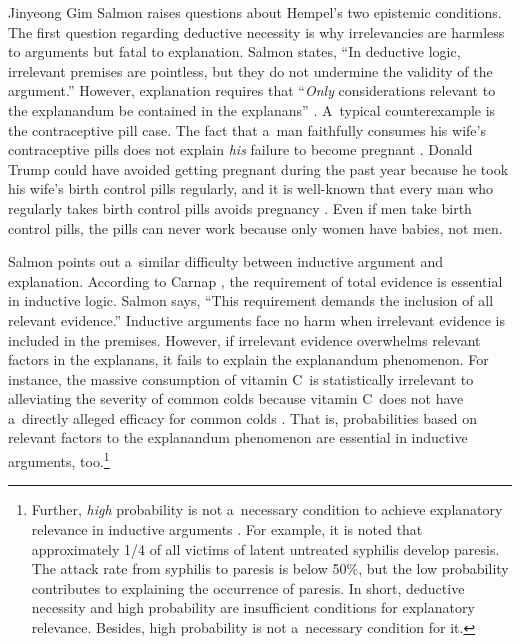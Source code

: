 \begin{artengenv}{Jinyeong Gim}
Salmon raises questions about Hempel's two epistemic conditions. The first question regarding deductive necessity is why irrelevancies are harmless to arguments but fatal to explanation. Salmon
\parencite*[][p.93]{salmon_scientific_1984} %
 states, ``In deductive logic, irrelevant premises are pointless, but they do not undermine the validity of the argument.'' However, explanation requires that ``\textit{Only} considerations relevant to the explanandum be contained in the explanans'' 
\parencite[][p.94]{salmon_scientific_1984}. %
 A~typical counterexample is the contraceptive pill case. The fact that a~man faithfully consumes his wife's contraceptive pills does not explain \textit{his} failure to become pregnant 
\parencite[][p.50]{salmon_four_1989}. %
 Donald Trump could have avoided getting pregnant during the past year because he took his wife's birth control pills regularly, and it is well-known that every man who regularly takes birth control pills avoids pregnancy 
\parencite[][p.34]{salmon_statistical_1971}. %
 Even if men take birth control pills, the pills can never work because only women have babies, not men.

Salmon points out a~similar difficulty between inductive argument and explanation. According to Carnap
\parencite*[][sec.45B]{carnap_logical_1950}, %
 the requirement of total evidence is essential in inductive logic. Salmon 
\parencite*[][p.93]{salmon_scientific_1984} %
 says, ``This requirement demands the inclusion of all relevant evidence.'' Inductive arguments face no harm when irrelevant evidence is included in the premises. However, if irrelevant evidence overwhelms relevant factors in the explanans, it fails to explain the explanandum phenomenon. For instance, the massive consumption of vitamin C~is statistically irrelevant to alleviating the severity of common colds because vitamin C~does not have a~directly alleged efficacy for common colds 
\parencites[][p.94]{salmon_scientific_1984}[][p.58]{salmon_four_1989}. %
 That is, probabilities based on relevant factors to the explanandum phenomenon are essential in inductive arguments, too.\footnote{Further, \textit{high} probability is not a~necessary condition to achieve explanatory relevance in inductive arguments 
\parencite[][p.49]{salmon_four_1989}. %
 For example, it is noted that approximately 1/4 of all victims of latent untreated syphilis develop paresis. The attack rate from syphilis to paresis is below 50\%, but the low probability contributes to explaining the occurrence of paresis. In short, deductive necessity and high probability are insufficient conditions for explanatory relevance. Besides, high probability is not a~necessary condition for it.}


\end{artengenv}
